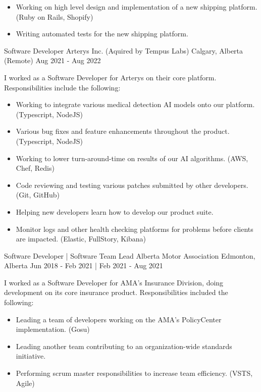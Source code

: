 \begin{cventries}
{            \begin{itemize}
                \item Working on high level design and implementation of a new shipping platform. (Ruby on Rails, Shopify)
                \item Writing automated tests for the new shipping platform. 
            \end{itemize}
        }
    \cventry
        {Software Developer}
        {Arterys Inc. (Aquired by Tempus Labs)}
        {Calgary, Alberta (Remote)}
        {Aug 2021 - Aug 2022}
        {
            I worked as a Software Developer for Arterys on their core platform.  Responsibilities include the following:
            \begin{itemize}
                \item Working to integrate various medical detection AI models onto our platform. (Typescript, NodeJS)
                \item Various bug fixes and feature enhancements throughout the product. (Typescript, NodeJS)
                \item Working to lower turn-around-time on results of our AI algorithms. (AWS, Chef, Redis)
                \item Code reviewing and testing various patches submitted by other developers. (Git, GitHub)
                \item Helping new developers learn how to develop our product suite. 
                \item Monitor logs and other health checking platforms for problems before clients are impacted. (Elastic, FullStory, Kibana)
            \end{itemize}
        }
    \cventry
        {Software Developer | Software Team Lead}
        {Alberta Motor Association}
        {Edmonton, Alberta}
        {Jun 2018 - Feb 2021 | Feb 2021 - Aug 2021}
        {
            I worked as a Software Developer for AMA’s Insurance Division, doing development on its core insurance product.  Responsibilities included the following:
            \begin{itemize}
                \item Leading a team of developers working on the AMA's PolicyCenter implementation. (Gosu)
                \item Leading another team contributing to an organization-wide standards initiative. 
                \item Performing scrum master responsibilities to increase team efficiency. (VSTS, Agile)

\end{itemize}}
\end{cventries}
